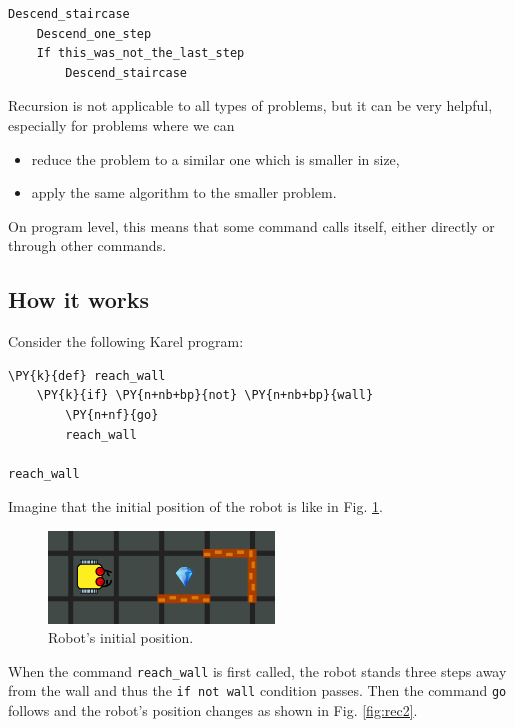 \begin{bbox}
\begin{Verbatim}[commandchars=\\\{\}]
Descend_staircase
    Descend_one_step
    If this_was_not_the_last_step
        Descend_staircase
\end{Verbatim}
\end{bbox}
\vspace{6mm}

\noindent
Recursion is not applicable to all types of problems, but it can be very 
helpful, especially for problems where we can
\begin{itemize}
\item reduce the problem to a similar one which is smaller in size, 
\item apply the same algorithm to the smaller problem. 
\end{itemize}
On program level, this means that some command calls itself, either 
directly or through other commands.

\subsection[\ \ How it works]{How it works} 

Consider the following Karel program:\\

\begin{bbox}
\begin{Verbatim}[commandchars=\\\{\}]
\PY{k}{def} reach_wall
    \PY{k}{if} \PY{n+nb+bp}{not} \PY{n+nb+bp}{wall}
        \PY{n+nf}{go}
        reach_wall

reach_wall
\end{Verbatim}
\end{bbox}
\vspace{6mm}

\noindent
Imagine that the initial position of the robot is like in Fig. \ref{fig:rec1}.


\begin{figure}[!ht]
\begin{center}
\includegraphics[width=6cm]{img/rec-1.png}
\end{center}
\vspace{-4mm}
\caption{Robot's initial position.}
\label{fig:rec1}
\vspace{-4mm}
\end{figure}
\noindent
When the command {\tt reach\_wall} is first called, the robot stands three steps away from the wall and 
thus the {\tt if not wall} condition passes. Then the command {\tt go} follows and the robot's 
position changes as shown in Fig. \ref{fig:rec2}. 

